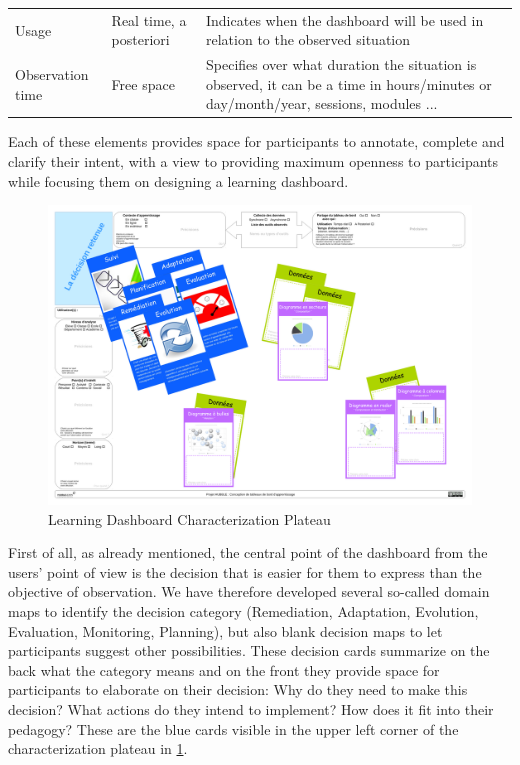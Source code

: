 \documentclass[preprint,12pt]{elsarticle}
\begin{document}
\begin{table}[]
\begin{tabular}{@{}p{2.7cm}p{4.5cm}p{8.2cm}@{}}
    Usage             & Real time, a posteriori                                         & Indicates when the dashboard will be used in relation to the observed situation                                                    \\
    Observation time  & Free space                                                      & Specifies over what duration the situation is observed, it can be a time in hours/minutes or day/month/year, sessions, modules ... \\ \bottomrule
    \end{tabular}
    \end{table}
    \endgroup

Each of these elements provides space for participants to annotate, complete and clarify their intent, with a view to providing maximum openness to participants while focusing them on designing a learning dashboard.
\begin{figure}[!htp]
    \centering
    \includegraphics[width= \linewidth]{figs/plateau.pdf}
    \caption{Learning Dashboard Characterization Plateau}
    \label{fig:plateau}
    \end{figure}
First of all, as already mentioned, the central point of the dashboard from the users' point of view is the decision that is easier for them to express than the objective of observation.
We have therefore developed several so-called domain maps to identify the decision category (Remediation, Adaptation, Evolution, Evaluation, Monitoring, Planning), but also blank decision maps to let participants suggest other possibilities. These decision cards summarize on the back what the category means and on the front they provide space for participants to elaborate on their decision: Why do they need to make this decision? What
actions do they intend to implement? How does it fit into their pedagogy? These are the blue cards visible in the upper left corner of the characterization plateau in \ref{fig:plateau}.
\end{document}
